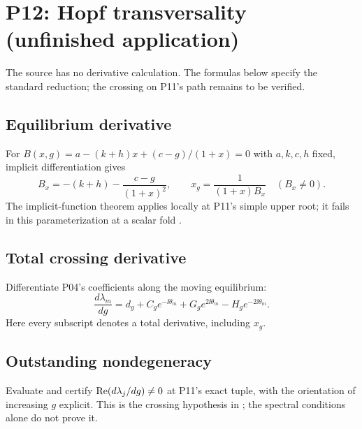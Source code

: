 \section{P12: Hopf transversality (unfinished application)}
\label{sec:P12}
The source has no derivative calculation. The formulas below specify
the standard reduction; the crossing on P11's path remains to be verified.
\subsection{Equilibrium derivative}\label{slot:P12-1}
For $B(x,g)=a-(k+h)x+(c-g)/(1+x)=0$ with $a,k,c,h$ fixed,
implicit differentiation gives
\[
 B_x=-(k+h)-\frac{c-g}{(1+x)^2},\qquad
 x_g=\frac{1}{(1+x)B_x}\quad(B_x\ne0).
\]
The implicit-function theorem applies locally at P11's simple upper root;
it fails in this parameterization at a scalar fold
\cite[Ch.~1]{GuckenheimerHolmes1983}.
\subsection{Total crossing derivative}\label{slot:P12-2}
Differentiate P04's coefficients along the moving equilibrium:
\[
 \frac{d\lambda_m}{dg}
 =d_g+C_g e^{-\ii\theta_m}+G_g e^{2\ii\theta_m}-H_g e^{-2\ii\theta_m}.
\]
Here every subscript denotes a total derivative, including $x_g$.
\subsection{Outstanding nondegeneracy}\label{slot:P12-3}
Evaluate and certify $\operatorname{Re}(d\lambda_j/dg)\ne0$ at P11's exact tuple,
with the orientation of increasing $g$ explicit. This is the crossing
hypothesis in \cite{KuznetsovHopf2006}; the spectral conditions alone
do not prove it.
